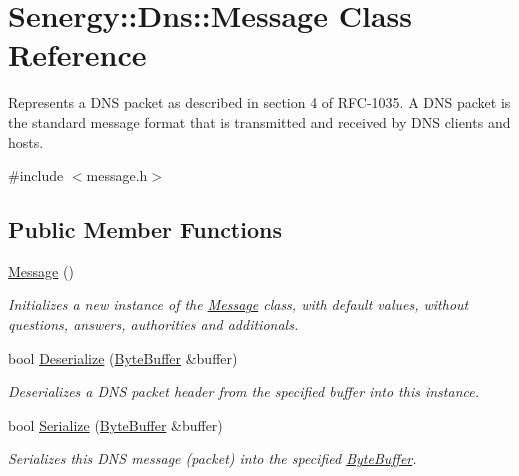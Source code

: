 \hypertarget{class_senergy_1_1_dns_1_1_message}{\section{Senergy\-:\-:Dns\-:\-:Message Class Reference}
\label{class_senergy_1_1_dns_1_1_message}
}


Represents a D\-N\-S packet as described in section 4 of R\-F\-C-\/1035. A D\-N\-S packet is the standard message format that is transmitted and received by D\-N\-S clients and hosts.  




{\ttfamily \#include $<$message.\-h$>$}

\subsection*{Public Member Functions}
\begin{DoxyCompactItemize}
\item 
\hyperlink{class_senergy_1_1_dns_1_1_message_a3e7192f2293903a43e7d08960b08a8b1}{Message} ()
\begin{DoxyCompactList}\small\item\em Initializes a new instance of the \hyperlink{class_senergy_1_1_dns_1_1_message}{Message} class, with default values, without questions, answers, authorities and additionals. \end{DoxyCompactList}\item 
bool \hyperlink{class_senergy_1_1_dns_1_1_message_a3857764a799ab123405420345f9b03ee}{Deserialize} (\hyperlink{class_senergy_1_1_byte_buffer}{Byte\-Buffer} \&buffer)
\begin{DoxyCompactList}\small\item\em Deserializes a D\-N\-S packet header from the specified buffer into this instance. \end{DoxyCompactList}\item 
bool \hyperlink{class_senergy_1_1_dns_1_1_message_a2e7978e799fadaa4f03fc881e5c8e0f6}{Serialize} (\hyperlink{class_senergy_1_1_byte_buffer}{Byte\-Buffer} \&buffer)
\begin{DoxyCompactList}\small\item\em Serializes this D\-N\-S message (packet) into the specified \hyperlink{class_senergy_1_1_byte_buffer}{Byte\-Buffer}. \end{DoxyCompactList}\end{DoxyCompactItemize}
